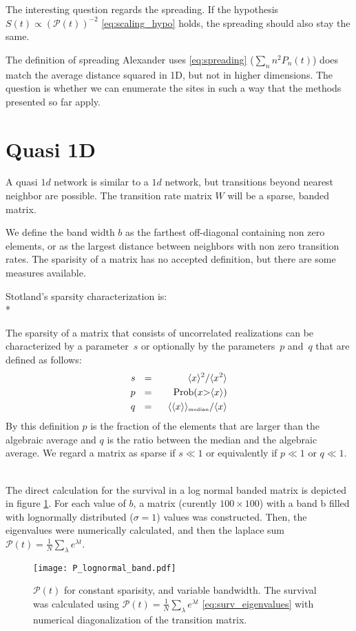 \documentclass[onecolumn,fleqn]{revtex4}
\newcommand{\tbox}[1]{\mbox{\tiny #1}}
\newenvironment{fminipage}%
  {\begin{Sbox}\begin{minipage}}%
  {\end{minipage}\end{Sbox}\fbox{\TheSbox}}
\begin{document}
The interesting question regards the spreading. If the hypothesis $S(t) \propto \left(\mathcal{P}(t)\right)^{-2}$ \eqref{eq:scaling_hypo} holds, the spreading should also stay the same. 

The definition of spreading Alexander uses \eqref{eq:spreading} ($\sum_n n^2 P_n(t)$) does match the average distance squared in 1D, but not in higher dimensions. The question is whether we can enumerate the sites in such a way that the methods presented so far apply.

\section{Quasi 1D}\label{sec:quasi1d}
A quasi $1d$ network is similar to a $1d$ network, but transitions beyond nearest neighbor are possible. The transition rate matrix $W$ will be a sparse, banded matrix. 

We define the band width $b$ as the farthest off-diagonal containing non zero elements, or as the largest distance between neighbors with non zero transition rates. The sparisity of a matrix has no accepted definition, but there are some measures available.


Stotland's \cite{Stotland:2010:PRB}  sparsity characterization is:\\*
\begin{fminipage}{\textwidth}
The sparsity of a matrix that consists of 
uncorrelated realizations can be characterized 
by a parameter~$s$ or optionally 
by the parameters~$p$ and~$q$ that 
are defined as follows: 
%
\begin{align*}
s \ \ &=& \ \ \langle x \rangle^2 / \langle x^2 \rangle \\
p \ \ &=& \ \ \mbox{Prob}(x {>} \langle x\rangle) \\
q \ \ &=& \ \ \langle\langle x \rangle\rangle_{\tbox{median}}/\langle x \rangle
\end{align*}
%
By this definition $p$ is the fraction of the elements that 
are larger than the algebraic average and $q$ is the ratio between the median
and the algebraic average.
We regard a matrix as sparse if $s\ll1$  
or equivalently if $p \ll 1$ or $q \ll 1$. 

\end{fminipage}
\\

The direct calculation for the survival in a log normal banded matrix is depicted in figure \ref{fig:p_lognormal_band}. For each value of $b$, a matrix (curently $100
\times 100$) with a band b filled with lognormally distributed ($\sigma=1$) values was constructed. Then, the eigenvalues were numerically calculated, and then the laplace sum $\mathcal{P}(t) =\frac{1}{N}\sum_\lambda e^{\lambda t}$.
\begin{figure}
\texttt{[image: P\_lognormal\_band.pdf]}
\caption{$\mathcal{P}(t)$ for constant sparisity, and variable bandwidth. The survival was calculated using $\mathcal{P}(t) =\frac{1}{N}\sum_\lambda e^{\lambda t}$ \eqref{eq:surv_eigenvalues} with numerical diagonalization of the transition matrix.
}
\label{fig:p_lognormal_band}
\end{figure}
\end{document}
